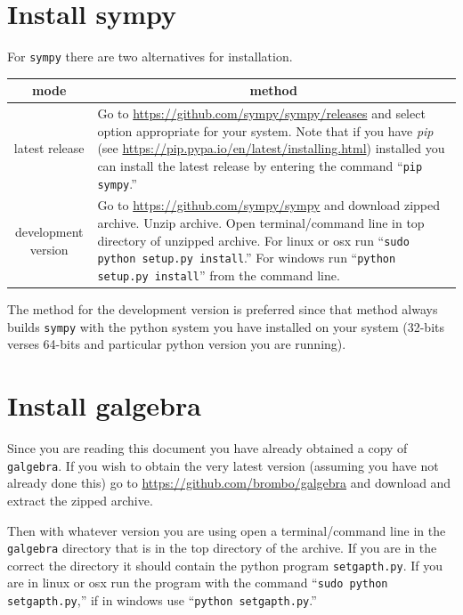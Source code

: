\documentclass[12pt]{report}
\newcommand{\T}[1]{\texttt{#1}}
\begin{document}
\section{Install sympy}
For \T{sympy} there are two alternatives for installation.
\begin{center}
\begin{tabular}{cl}
 mode & \multicolumn{1}{c}{method} \vspace{5pt} \\ \hline
 latest release & \parbox{4in}{\vspace{5pt}Go to \url{https://github.com/sympy/sympy/releases} and select
                               option appropriate for your system. Note that if you have \emph{pip}
                               (see \url{https://pip.pypa.io/en/latest/installing.html}) installed you can install
                               the latest release by entering the command ``\T{pip sympy}.'' \vspace{5pt}} \\ \hline
 development version & \parbox{4in}{\vspace{5pt}Go to \url{https://github.com/sympy/sympy} and download zipped archive.
                                    Unzip archive.  Open terminal/command line in top directory of unzipped
                                    archive. For linux or osx run ``\T{sudo python setup.py install}.'' For windows run
                                    ``\T{python setup.py install}'' from the command line.\vspace{5pt}} \\ \hline
\end{tabular}
\end{center}
The method for the development version is preferred since that method always builds \T{sympy} with the python system you have
installed on your system (32-bits verses 64-bits and particular python version you are running).
\section{Install galgebra}
Since you are reading this document you have already obtained a copy of \T{galgebra}.  If you wish to obtain the very latest
version (assuming you have not already done this) go to \url{https://github.com/brombo/galgebra} and download and extract the
zipped archive.

Then with whatever version you are using open a terminal/command line in the \T{galgebra} directory that is in the top directory
of the archive.  If you are in the correct the directory it should contain the python program \T{setgapth.py}.  If you are in
linux or osx run the program with the command ``\T{sudo python setgapth.py},'' if in windows use ``\T{python setgapth.py}.''
\end{document}
